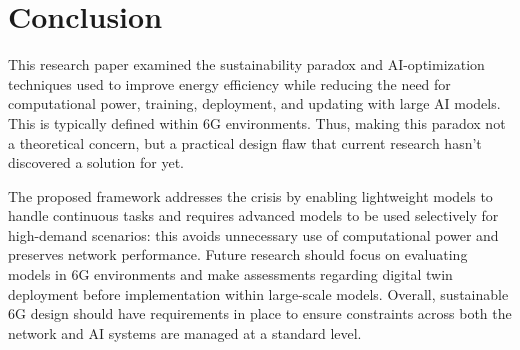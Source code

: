 \documentclass[letterpaper]{article} %
\begin{document}
\section{Conclusion}
This research paper examined the sustainability paradox and AI-optimization techniques used to improve energy efficiency while reducing the need for computational power, training, deployment, and updating with large AI models. This is typically defined within 6G environments. Thus, making this paradox not a theoretical concern, but a practical design flaw that current research hasn’t discovered a solution for yet. 

The proposed framework addresses the crisis by enabling lightweight models to handle continuous tasks and requires advanced models to be used selectively for high-demand scenarios: this avoids unnecessary use of computational power and preserves network performance. Future research should focus on evaluating models in 6G environments and make assessments regarding digital twin deployment before implementation within large-scale models. Overall, sustainable 6G design should have requirements in place to ensure constraints across both the network and AI systems are managed at a standard level. 



\end{document}
